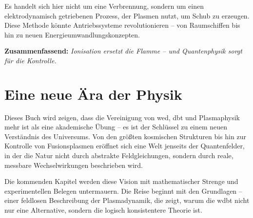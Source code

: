 Es handelt sich hier nicht um eine Verbrennung, sondern um einen elektrodynamisch getriebenen Prozess, der Plasmen nutzt, um Schub zu erzeugen. Diese Methode könnte Antriebssysteme
revolutionieren – von Raumschiffen bis hin zu neuen Energieumwandlungskonzepten.

\textbf{Zusammenfassend:} \textit{Ionisation ersetzt die Flamme – und Quantenphysik sorgt für die Kontrolle.}

\section{Eine neue Ära der Physik}
Dieses Buch wird zeigen, dass die Vereinigung von \gls{wed}, \gls{dbt} und Plasmaphysik mehr ist als eine akademische Übung – es ist der Schlüssel zu
einem neuen Verständnis des Universums. Von den größten kosmischen Strukturen bis hin zur Kontrolle von Fusionsplasmen eröffnet sich eine Welt jenseits der Quantenfelder, in der
die Natur nicht durch abstrakte Feldgleichungen, sondern durch reale, messbare Wechselwirkungen beschrieben wird.

Die kommenden Kapitel werden diese Vision mit mathematischer Strenge und experimentellen Belegen untermauern. Die Reise beginnt mit den Grundlagen – einer feldlosen Beschreibung
der Plasmadynamik, die zeigt, warum die \gls{wdbt} nicht nur eine Alternative, sondern die logisch konsistentere Theorie ist.
